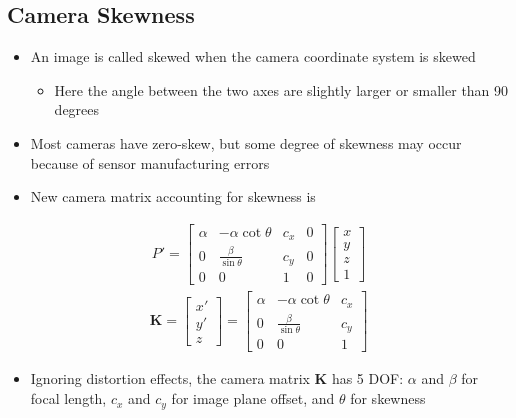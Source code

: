 \documentclass[letterpaper,12pt]{article}
\newcommand{\matr}[1]{\mathbf{#1}}
\begin{document}
\subsection{Camera Skewness}
\begin{itemize}
 \item An image is called skewed when the camera coordinate system is skewed
       \begin{itemize}
        \item Here the angle between the two axes are slightly larger or smaller than 90 degrees
       \end{itemize}
 \item Most cameras have zero-skew, but some degree of skewness may occur because of sensor manufacturing errors
 \item New camera matrix accounting for skewness is
\end{itemize}
\begin{align}
 P' = \begin{bmatrix}
  \alpha & -\alpha\cot\theta        & c_x & 0 \\
  0      & \frac{\beta}{\sin\theta} & c_y & 0 \\
  0      & 0                        & 1   & 0
 \end{bmatrix}
 \begin{bmatrix}
  x \\
  y \\
  z \\
  1
 \end{bmatrix}
\end{align}
\begin{align}
 \matr{K} = \begin{bmatrix}
  x' \\
  y' \\
  z
 \end{bmatrix}
 = \begin{bmatrix}
  \alpha & -\alpha\cot\theta        & c_x \\
  0      & \frac{\beta}{\sin\theta} & c_y \\
  0      & 0                        & 1
 \end{bmatrix}
\end{align}
\begin{itemize}
 \item Ignoring distortion effects, the camera matrix $\matr{K}$ has 5 DOF: $\alpha$ and $\beta$ for focal length, $c_x$ and $c_y$ for image plane offset, and $\theta$ for skewness
\end{itemize}
\end{document}
